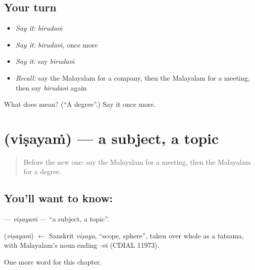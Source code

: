 \subsection*{Your turn}
\begin{itemize}
\raggedright
  \item \emph{Say it:} \emph{birudaṁ}
  \item \emph{Say it:} \emph{birudaṁ}, once more
  \item \emph{Say it:} say \emph{birudaṁ}
  \item \emph{Recall:} say the Malayalam for a company, then the Malayalam for a meeting, then say \emph{birudaṁ} again
\end{itemize}

\begin{tcolorbox}[breakable,colback=teal!4,colframe=teal!35!black,title={Before you move on}]
What does  mean? (\textquotedblleft{}A degree\textquotedblright{}.) Say it once more.
\end{tcolorbox}
\section[\texorpdfstring{\ml{വിഷയം} (viṣayaṁ)}{വിഷയം (viṣayaṁ)}]{ (viṣayaṁ) — a subject, a topic}

\label{lesson:ML-C335-visayam}



\begin{quote}
Before the new one: say the Malayalam for a meeting, then the Malayalam for a degree.
\end{quote}

\subsection*{You'll want to know: }
\textbf{} — \emph{viṣayaṁ} — \textquotedblleft{}a subject, a topic\textquotedblright{}.

\begin{cousinweb}
\textbf{} (\emph{viṣayaṁ}) $\leftarrow$ Sanskrit \emph{viṣaya}, \textquotedblleft{}scope, sphere\textquotedblright{}, taken over whole as a tatsama, with Malayalam's noun ending \emph{-ṁ} (CDIAL 11973).
\end{cousinweb}

\begin{grammarlens}[title={What you've built}]
One more word for this chapter.
\end{grammarlens}

